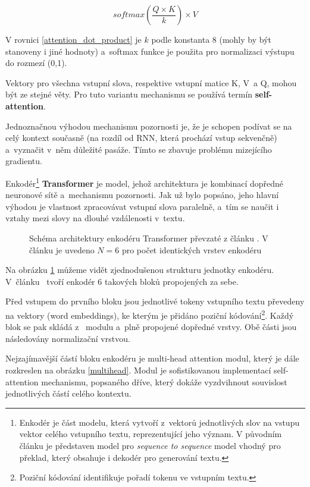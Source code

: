 \begin{equation}
    \label{attention_dot_product}
    softmax(\frac{Q \times K}{k})\times V
\end{equation}

V rovnici \ref{attention_dot_product} je $k$ podle \cite{Transformers} konstanta 8 (mohly by být stanoveny i jiné hodnoty) a~softmax funkce je použita pro normalizaci výstupu do rozmezí (0,1).\par
Vektory pro všechna vstupní slova, respektive vstupní matice K, V~a Q, mohou být ze stejné věty. Pro tuto variantu mechanismu se používá termín \textbf{self-attention}.\par 
Jednoznačnou výhodou mechanismu pozornosti je, že je schopen podívat se na celý kontext současně (na rozdíl od RNN, která prochází vstup sekvenčně) a~vyznačit v~něm důležité pasáže. Tímto se zbavuje problému mizejícího gradientu.\par\medskip

Enkodér\footnote{Enkodér je část modelu, která vytvoří z~vektorů jednotlivých slov na vstupu vektor celého vstupního textu, reprezentující jeho význam. V původním článku \cite{Transformers} je představen model pro \emph{sequence to sequence} model vhodný pro překlad, který obsahuje i dekodér pro generování textu.} \textbf{Transformer} je model, jehož architektura je kombinací dopředné neuronové sítě a~mechanismu pozornosti. Jak už bylo popsáno, jeho hlavní výhodou je vlastnost zpracovávat vstupní slova paralelně, a~tím se naučit i vztahy mezi slovy na dlouhé vzdálenosti v~textu.\par

\begin{figure}[hbt]
    \centering
	\caption{Schéma architektury enkodéru Transformer převzaté z článku \cite{Transformers}. V článku je uvedeno $N=6$ pro počet identických vrstev enkodéru}
	\label{transformer_encoder}
\end{figure}

Na obrázku \ref{transformer_encoder} můžeme vidět zjednodušenou strukturu jednotky enkodéru. V~článku~\cite{Transformers} tvoří enkodér 6 takových bloků propojených za sebe.\par
Před vstupem do prvního bloku jsou jednotlivé tokeny vstupního textu převedeny na vektory (word embeddings), ke kterým je přidáno poziční kódování\footnote{Poziční kódování identifikuje pořadí tokenu ve vstupním textu.}. Každý blok se pak skládá z~ modulu a~plně propojené dopředné vrstvy. Obě části jsou následovány normalizační vrstvou.\par
Nejzajímavější částí bloku enkodéru je multi-head attention modul, který je dále rozkreslen na obrázku \ref{multihead}. Modul je sofistikovanou implementací self-attention mechanismu, popsaného dříve, který dokáže vyzdvihnout souvislost jednotlivých částí celého kontextu. 

